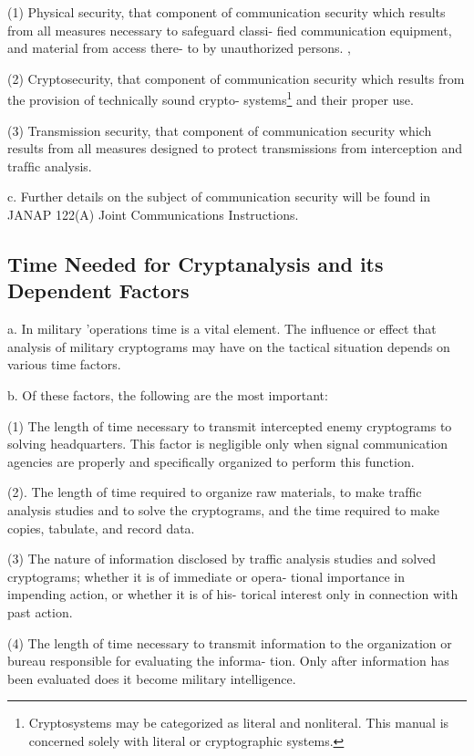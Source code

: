 (1) Physical security, that component of communication security
which results from all measures necessary to safeguard classi-
ﬁed communication equipment, and material from access there-
to by unauthorized persons. ,

(2) Cryptosecurity, that component of communication security
which results from the provision of technically sound crypto-
systems\footnote{ Cryptosystems may be categorized as literal and nonliteral. This manual is concerned solely with literal or cryptographic systems.  } and their proper use.

(3) Transmission security, that component of communication
security which results from all measures designed to protect
transmissions from interception and trafﬁc analysis.

c. Further details on the subject of communication security will be
found in JANAP 122(A) Joint Communications Instructions.

\subsection{Time Needed for Cryptanalysis and its Dependent Factors}

a. In military 'operations time is a vital element. The inﬂuence or effect
that analysis of military cryptograms may have on the tactical situation
depends on various time factors.

b. Of these factors, the following are the most important:

(1) The length of time necessary to transmit intercepted enemy
cryptograms to solving headquarters. This factor is negligible
only when signal communication agencies are properly and
speciﬁcally organized to perform this function.

(2). The length of time required to organize raw materials, to make
trafﬁc analysis studies and to solve the cryptograms, and the
time required to make copies, tabulate, and record data.

(3) The nature of information disclosed by traffic analysis studies
and solved cryptograms; whether it is of immediate or opera-
tional importance in impending action, or whether it is of his-
torical interest only in connection with past action.

(4) The length of time necessary to transmit information to the
organization or bureau responsible for evaluating the informa-
tion. Only after information has been evaluated does it become
military intelligence.

